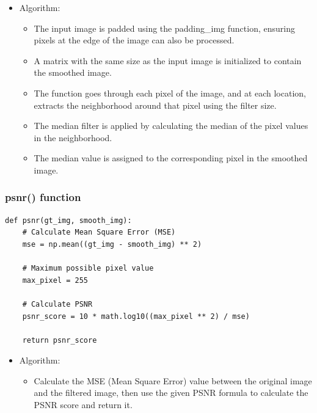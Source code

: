 \documentclass{article}
\begin{document}
\begin{itemize}
    
    \item Algorithm:
    \begin{itemize}
        \item The input image is padded using the padding\_img function, ensuring pixels at the edge of the image can also be processed.
        \item A matrix with the same size as the input image is initialized to contain the smoothed image.
        \item The function goes through each pixel of the image, and at each location, extracts the neighborhood around that pixel using the filter size.
        \item The median filter is applied by calculating the median of the pixel values in the neighborhood.
        \item The median value is assigned to the corresponding pixel in the smoothed image.
    \end{itemize}
\end{itemize}


\subsubsection{psnr() function}
\begin{lstlisting}[caption={Code of psnr() function}, label={psnr()}]
def psnr(gt_img, smooth_img):
    # Calculate Mean Square Error (MSE)
    mse = np.mean((gt_img - smooth_img) ** 2)

    # Maximum possible pixel value
    max_pixel = 255

    # Calculate PSNR
    psnr_score = 10 * math.log10((max_pixel ** 2) / mse)

    return psnr_score
\end{lstlisting}

\begin{itemize}
    
    \item Algorithm:
    \begin{itemize}
        \item Calculate the MSE (Mean Square Error) value between the original image and the filtered image, then use the given PSNR formula to calculate the PSNR score and return it.
    \end{itemize}
\end{itemize}
\end{document}
